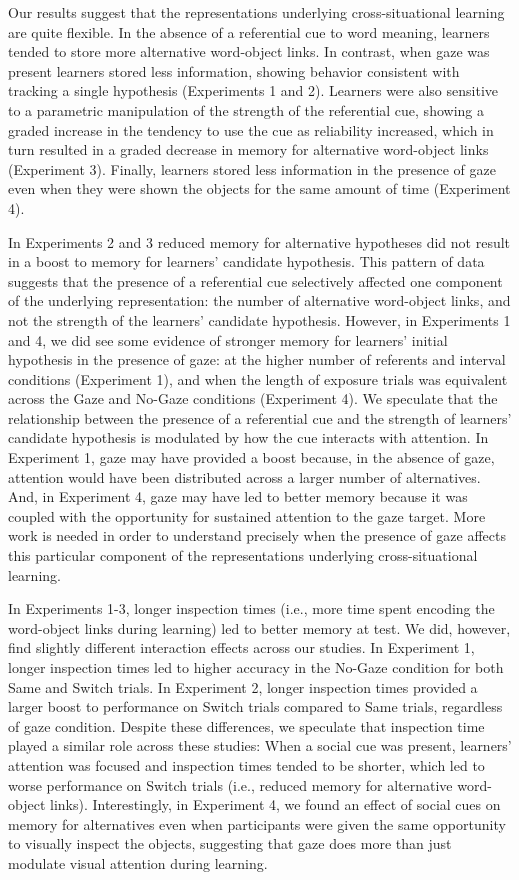 \documentclass[oneside]{report}
\begin{document}
Our results suggest that the representations underlying
cross-situational learning are quite flexible. In the absence of a
referential cue to word meaning, learners tended to store more
alternative word-object links. In contrast, when gaze was present
learners stored less information, showing behavior consistent with
tracking a single hypothesis (Experiments 1 and 2). Learners were also
sensitive to a parametric manipulation of the strength of the
referential cue, showing a graded increase in the tendency to use the
cue as reliability increased, which in turn resulted in a graded
decrease in memory for alternative word-object links (Experiment 3).
Finally, learners stored less information in the presence of gaze even
when they were shown the objects for the same amount of time (Experiment
4).

In Experiments 2 and 3 reduced memory for alternative hypotheses did not
result in a boost to memory for learners' candidate hypothesis. This
pattern of data suggests that the presence of a referential cue
selectively affected one component of the underlying representation: the
number of alternative word-object links, and not the strength of the
learners' candidate hypothesis. However, in Experiments 1 and 4, we did
see some evidence of stronger memory for learners' initial hypothesis in
the presence of gaze: at the higher number of referents and interval
conditions (Experiment 1), and when the length of exposure trials was
equivalent across the Gaze and No-Gaze conditions (Experiment 4). We
speculate that the relationship between the presence of a referential
cue and the strength of learners' candidate hypothesis is modulated by
how the cue interacts with attention. In Experiment 1, gaze may have
provided a boost because, in the absence of gaze, attention would have
been distributed across a larger number of alternatives. And, in
Experiment 4, gaze may have led to better memory because it was coupled
with the opportunity for sustained attention to the gaze target. More
work is needed in order to understand precisely when the presence of
gaze affects this particular component of the representations underlying
cross-situational learning.

In Experiments 1-3, longer inspection times (i.e., more time spent
encoding the word-object links during learning) led to better memory at
test. We did, however, find slightly different interaction effects
across our studies. In Experiment 1, longer inspection times led to
higher accuracy in the No-Gaze condition for both Same and Switch
trials. In Experiment 2, longer inspection times provided a larger boost
to performance on Switch trials compared to Same trials, regardless of
gaze condition. Despite these differences, we speculate that inspection
time played a similar role across these studies: When a social cue was
present, learners' attention was focused and inspection times tended to
be shorter, which led to worse performance on Switch trials (i.e.,
reduced memory for alternative word-object links). Interestingly, in
Experiment 4, we found an effect of social cues on memory for
alternatives even when participants were given the same opportunity to
visually inspect the objects, suggesting that gaze does more than just
modulate visual attention during learning.
\end{document}
